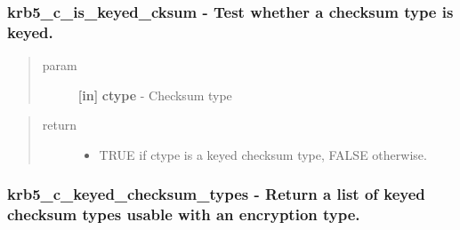 \documentclass[letterpaper,10pt,english]{sphinxmanual}
\begin{document}
\subsubsection{krb5\_c\_is\_keyed\_cksum -  Test whether a checksum type is keyed.}
\label{appdev/refs/api/krb5_c_is_keyed_cksum::doc}\label{appdev/refs/api/krb5_c_is_keyed_cksum:krb5-c-is-keyed-cksum-test-whether-a-checksum-type-is-keyed}

\begin{fulllineitems}
\label{appdev/refs/api/krb5_c_is_keyed_cksum:c.krb5_c_is_keyed_cksum}
\end{fulllineitems}

\begin{quote}\begin{description}
\item[{param}] \leavevmode
\textbf{{[}in{]}} \textbf{ctype} - Checksum type

\end{description}\end{quote}
\begin{quote}\begin{description}
\item[{return}] \leavevmode\begin{itemize}
\item {} 
TRUE if ctype is a keyed checksum type, FALSE otherwise.

\end{itemize}

\end{description}\end{quote}


\subsubsection{krb5\_c\_keyed\_checksum\_types -  Return a list of keyed checksum types usable with an encryption type.}
\label{appdev/refs/api/krb5_c_keyed_checksum_types::doc}\label{appdev/refs/api/krb5_c_keyed_checksum_types:krb5-c-keyed-checksum-types-return-a-list-of-keyed-checksum-types-usable-with-an-encryption-type}

\begin{fulllineitems}
\label{appdev/refs/api/krb5_c_keyed_checksum_types:c.krb5_c_keyed_checksum_types}
\end{fulllineitems}
\end{document}
